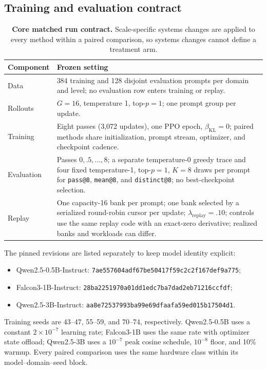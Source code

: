 \subsection{Training and evaluation contract}
\label{app:repro-run-contract}

\begin{table}[H]
  \centering
  \caption{\textbf{Core matched run contract.} Scale-specific systems changes
  are applied to every method within a paired comparison, so systems changes
  cannot define a treatment arm.}
  \label{tab:run-contract}
  \small
  \begin{tabularx}{\linewidth}{@{}P{.24\linewidth}Y@{}}
    \toprule
    \textbf{Component} & \textbf{Frozen setting} \\
    \midrule
    Data & 384 training and 128 disjoint evaluation prompts per domain and
      level; no evaluation row enters training or replay. \\
    Rollouts & $G=16$, temperature 1, top-$p=1$; one prompt group per update. \\
    Training & Eight passes (3,072 updates), one PPO epoch,
      $\beta_{\mathrm{KL}}=0$; paired methods share initialization, prompt stream,
      optimizer, and checkpoint cadence. \\
    Evaluation & Passes $0,.5,\ldots,8$; a separate temperature-0 greedy
      trace and four fixed temperature-1, top-$p=1$, $K=8$ draws per prompt for
      \texttt{pass@8}, \texttt{mean@8}, and \texttt{distinct@8}; no
      best-checkpoint selection. \\
    Replay & One capacity-16 bank per prompt; one bank selected by a serialized
      round-robin cursor per update; $\lambda_{\mathrm{replay}}=.10$; controls
      use the same replay code with an exact-zero derivative; realized banks and workloads can differ. \\
    \bottomrule
  \end{tabularx}
\end{table}

The pinned revisions are listed separately to keep model identity explicit:
\begin{itemize}
  \item Qwen2.5-0.5B-Instruct: {\scriptsize\texttt{7ae557604adf67be50417f59c2c2f167def9a775}};
  \item Falcon3-1B-Instruct: {\scriptsize\texttt{28ba2251970a01dd1edc7ba7dad2eb71216ccfdf}};
  \item Qwen2.5-3B-Instruct: {\scriptsize\texttt{aa8e72537993ba99e69dfaafa59ed015b17504d1}}.
\end{itemize}
Training seeds are 43--47, 55--59, and 70--74, respectively. Qwen2.5-0.5B uses a constant
$2\times10^{-7}$ learning rate; Falcon3-1B uses the same rate with optimizer
state offload; Qwen2.5-3B uses a $10^{-7}$ peak cosine schedule, $10^{-8}$
floor, and 10\% warmup. Every paired comparison uses the same hardware class
within its model--domain--seed block.

